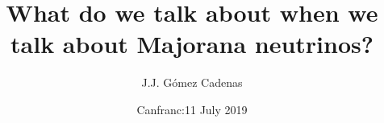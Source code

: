 \documentclass[9pt]{beamer}
\title{What do we talk about when we talk about Majorana neutrinos?}
\author{J.J. G\'omez Cadenas}
\institute{Donostia International Physics Center (DIPC)} %
\date[October 6th, 2018] %
{Canfranc:11 July 2019}
\begin{document}
\frame{\titlepage}





%


%
%


%
%

%
%
%
%
\end{document}
